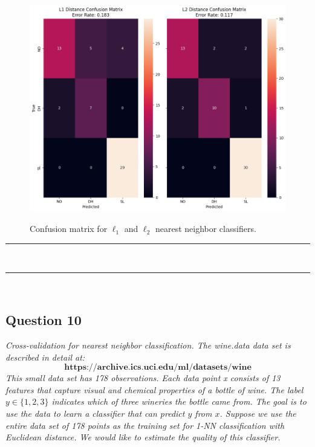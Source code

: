 \documentclass{article}
\begin{document}
\begin{figure}[H]
\includegraphics[width=1\textwidth]{q9.png} \\
\caption{Confusion matrix for $\ell_1$ and $\ell_2$ nearest neighbor classifiers.}
\label{fig:image_comparison}
\end{figure} 
      
\noindent\rule{\textwidth}{0.4pt}\\

\noindent\rule{\textwidth}{0.4pt}\\

\newpage
\subsection*{Question 10}
\textit{Cross-validation for nearest neighbor classification.
The wine.data data set is described in detail at:\newline \newline$$\textbf{https://archive.ics.uci.edu/ml/datasets/wine}$$
\newline This small data set has 178 observations. Each data point x consists of 13 features that capture visual
and chemical properties of a bottle of wine. The label $y \in \{1,2,3\}$ indicates which of three wineries
the bottle came from. The goal is to use the data to learn a classifier that can predict $y$ from $x$.\newline
\newline Suppose we use the entire data set of 178 points as the training set for 1-NN classification with Euclidean distance. We would like to estimate the quality of this classifier.}\\
\end{document}

